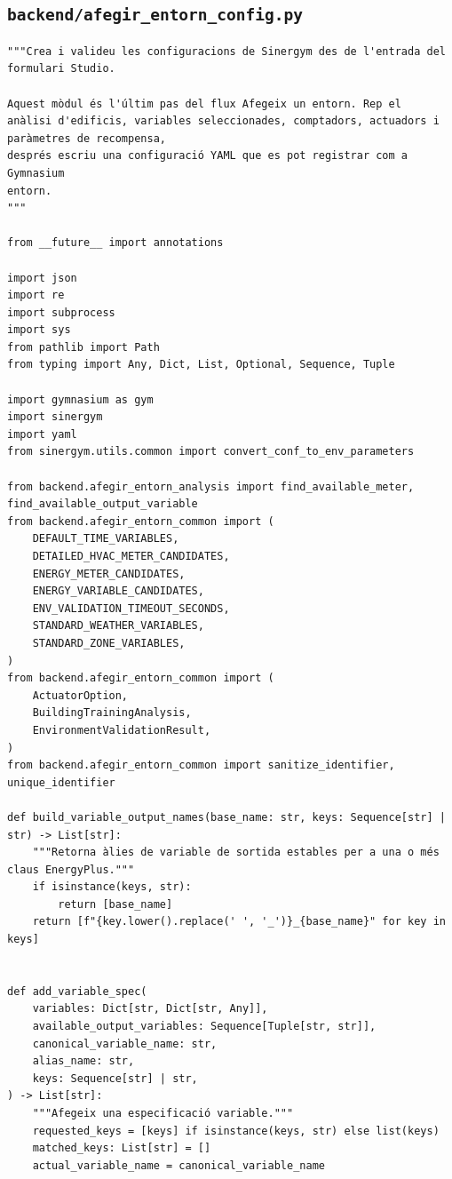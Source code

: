 \documentclass[10pt,a4paper]{article}
\begin{document}

\subsection{\texorpdfstring{\texttt{backend/afegir\_entorn\_config.py}}{backend/afegir\_entorn\_config.py}}

\begin{lstlisting}[style=studioPython,caption={backend/afegir\_entorn\_config.py},label={lst:backend-afegir-entorn-config-py}]
"""Crea i valideu les configuracions de Sinergym des de l'entrada del formulari Studio.

Aquest mòdul és l'últim pas del flux Afegeix un entorn. Rep el
anàlisi d'edificis, variables seleccionades, comptadors, actuadors i paràmetres de recompensa,
després escriu una configuració YAML que es pot registrar com a Gymnasium
entorn.
"""

from __future__ import annotations

import json
import re
import subprocess
import sys
from pathlib import Path
from typing import Any, Dict, List, Optional, Sequence, Tuple

import gymnasium as gym
import sinergym
import yaml
from sinergym.utils.common import convert_conf_to_env_parameters

from backend.afegir_entorn_analysis import find_available_meter, find_available_output_variable
from backend.afegir_entorn_common import (
    DEFAULT_TIME_VARIABLES,
    DETAILED_HVAC_METER_CANDIDATES,
    ENERGY_METER_CANDIDATES,
    ENERGY_VARIABLE_CANDIDATES,
    ENV_VALIDATION_TIMEOUT_SECONDS,
    STANDARD_WEATHER_VARIABLES,
    STANDARD_ZONE_VARIABLES,
)
from backend.afegir_entorn_common import (
    ActuatorOption,
    BuildingTrainingAnalysis,
    EnvironmentValidationResult,
)
from backend.afegir_entorn_common import sanitize_identifier, unique_identifier

def build_variable_output_names(base_name: str, keys: Sequence[str] | str) -> List[str]:
    """Retorna àlies de variable de sortida estables per a una o més claus EnergyPlus."""
    if isinstance(keys, str):
        return [base_name]
    return [f"{key.lower().replace(' ', '_')}_{base_name}" for key in keys]


def add_variable_spec(
    variables: Dict[str, Dict[str, Any]],
    available_output_variables: Sequence[Tuple[str, str]],
    canonical_variable_name: str,
    alias_name: str,
    keys: Sequence[str] | str,
) -> List[str]:
    """Afegeix una especificació variable."""
    requested_keys = [keys] if isinstance(keys, str) else list(keys)
    matched_keys: List[str] = []
    actual_variable_name = canonical_variable_name


\end{lstlisting}
\end{document}
